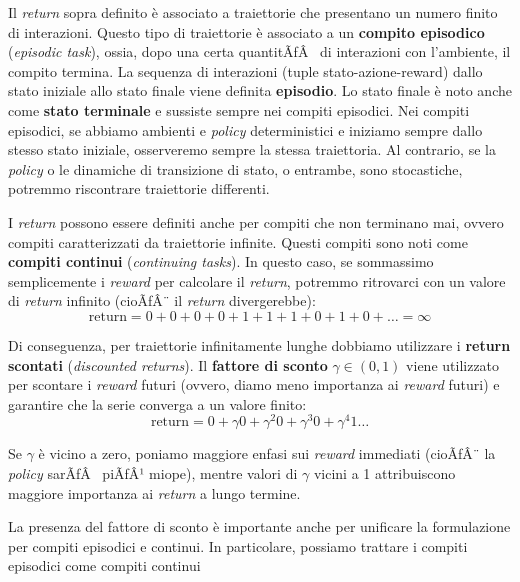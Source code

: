 ﻿\documentclass[11pt, a4paper]{report}
\begin{document}
Il \emph{return} sopra definito è associato a traiettorie che presentano un numero finito di interazioni. Questo tipo di traiettorie è associato a un \textbf{compito episodico} (\emph{episodic task}), ossia, dopo una certa quantitÃƒÂ  di interazioni con l'ambiente, il compito termina. La sequenza di interazioni (tuple stato-azione-reward) dallo stato iniziale allo stato finale viene definita \textbf{episodio}. Lo stato finale è noto anche come \textbf{stato terminale} e sussiste sempre nei compiti episodici. Nei compiti episodici, se abbiamo ambienti e \emph{policy} deterministici e iniziamo sempre dallo stesso stato iniziale, osserveremo sempre la stessa traiettoria. Al contrario, se la \emph{policy} o le dinamiche di transizione di stato, o entrambe, sono stocastiche, potremmo riscontrare traiettorie differenti.

I \emph{return} possono essere definiti anche per compiti che non terminano mai, ovvero compiti caratterizzati da traiettorie infinite. Questi compiti sono noti come \textbf{compiti continui} (\emph{continuing tasks}). In questo caso, se sommassimo semplicemente i \emph{reward} per calcolare il \emph{return}, potremmo ritrovarci con un valore di \emph{return} infinito (cioÃƒÂ¨ il \emph{return} divergerebbe):
\begin{equation}
\text{return} = 0 + 0 + 0 + 0 + 1 + 1 + 1 + 0 + 1 + 0 + \dots = \infty
\end{equation}

Di conseguenza, per traiettorie infinitamente lunghe dobbiamo utilizzare i \textbf{return scontati} (\emph{discounted returns}). Il \textbf{fattore di sconto} $\gamma \in (0, 1)$ viene utilizzato per scontare i \emph{reward} futuri (ovvero, diamo meno importanza ai \emph{reward} futuri) e garantire che la serie converga a un valore finito:
\begin{equation}
\text{return} = 0 + \gamma 0 + \gamma^2 0 + \gamma^3 0 + \gamma^4 1 \dots
\end{equation}

Se $\gamma$ è vicino a zero, poniamo maggiore enfasi sui \emph{reward} immediati (cioÃƒÂ¨ la \emph{policy} sarÃƒÂ  piÃƒÂ¹ miope), mentre valori di $\gamma$ vicini a 1 attribuiscono maggiore importanza ai \emph{return} a lungo termine.

La presenza del fattore di sconto è importante anche per unificare la formulazione per compiti episodici e continui. In particolare, possiamo trattare i compiti episodici come compiti continui

\newpage
\end{document}
